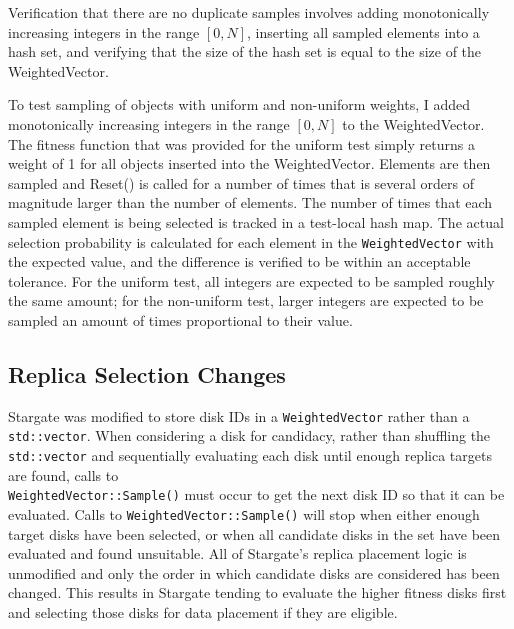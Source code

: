 \documentclass[12pt]{article}
\begin{document}
    Verification that there are no duplicate samples involves adding
    monotonically increasing integers in the range $[0,N]$, inserting all
    sampled elements into a hash set, and verifying that the size of the hash
    set is equal to the size of the WeightedVector.

    To test sampling of objects with uniform and non-uniform weights, I added
    monotonically increasing integers in the range $[0,N]$ to the
    WeightedVector. The fitness function that was provided for the uniform test
    simply returns a weight of 1 for all objects inserted into the
    WeightedVector.  Elements are then sampled and Reset() is called for a
    number of times that is several orders of magnitude larger than the number
    of elements. The number of times that each sampled element is being
    selected is tracked in a test-local hash map. The actual selection
    probability is calculated for each element in the \texttt{WeightedVector}
    with the expected value, and the difference is verified to be within an
    acceptable tolerance. For the uniform test, all integers are expected to be
    sampled roughly the same amount; for the non-uniform test, larger integers
    are expected to be sampled an amount of times proportional to their value.

  \subsection{Replica Selection Changes}
    
  Stargate was modified to store disk IDs in a \texttt{WeightedVector} rather
  than a \texttt{std::vector}. When considering a disk for candidacy, rather
  than shuffling the \texttt{std::vector} and sequentially evaluating each disk
  until enough replica targets are found, calls to \\
  \texttt{WeightedVector::Sample()} must occur to get the next disk ID so that
  it can be evaluated. Calls to \texttt{WeightedVector::Sample()} will stop
  when either enough target disks have been selected, or when all candidate
  disks in the set have been evaluated and found  unsuitable.  All of
  Stargate's replica placement logic is unmodified and only the order in which
  candidate disks are considered has been changed. This results in Stargate
  tending to evaluate the higher fitness disks first and selecting those disks
  for data placement if they are eligible.
      
\end{document}
